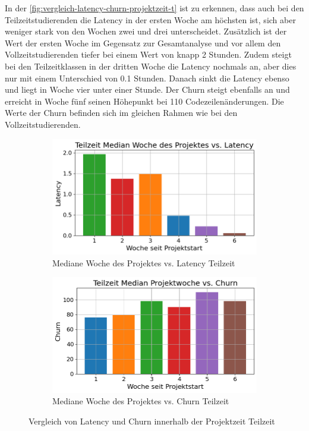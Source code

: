 In der \autoref{fig:vergleich-latency-churn-projektzeit-t} ist zu erkennen, dass auch bei den Teilzeitstudierenden die Latency in der ersten Woche am höchsten ist, sich aber weniger stark von den Wochen zwei und drei unterscheidet. Zusätzlich ist der Wert der ersten Woche im Gegensatz zur Gesamtanalyse und vor allem den Vollzeitstudierenden tiefer bei einem Wert von knapp 2 Stunden. Zudem steigt bei den Teilzeitklassen in der dritten Woche die Latency nochmals an, aber dies nur mit einem Unterschied von 0.1 Stunden. Danach sinkt die Latency ebenso und liegt in Woche vier unter einer Stunde. Der Churn steigt ebenfalls an und erreicht in Woche fünf seinen Höhepunkt bei 110 Codezeilenänderungen. Die Werte der Churn befinden sich im gleichen Rahmen wie bei den Vollzeitstudierenden.

\begin{figure}[htbp]
    \centering
    \begin{subfigure}[b]{0.48\textwidth}
        \centering
        \includegraphics[width=\textwidth]{Figures/mittelwert-woche-lateny-t.png}
        \caption{Mediane Woche des Projektes vs. Latency Teilzeit}
        \label{fig:mittelwert-woche-lateny-t}
    \end{subfigure}
    \hfill
    \begin{subfigure}[b]{0.48\textwidth}
        \centering
        \includegraphics[width=\textwidth]{Figures/mittelwert-woche-churn-t.png}
        \caption{Mediane Woche des Projektes vs. Churn Teilzeit}
        \label{fig:mittelwert-woche-churn-t}
    \end{subfigure}
    \caption{Vergleich von Latency und Churn innerhalb der Projektzeit Teilzeit}
    \label{fig:vergleich-latency-churn-projektzeit-t}
\end{figure}

